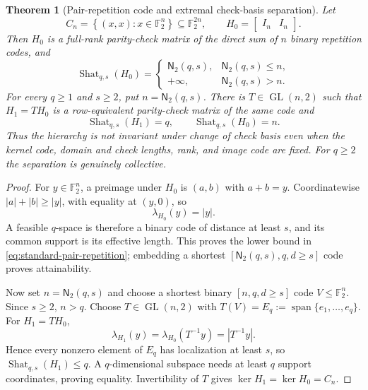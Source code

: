 \documentclass[11pt,letterpaper]{article}
\theoremstyle{plain}
\newtheorem{theorem}{Theorem}[section]
\theoremstyle{definition}
\newcommand{\F}{\mathbb{F}_2}
\newcommand{\Shat}{\operatorname{Shat}}
\newcommand{\1}{\mathbf{1}}
\newcommand{\abs}[1]{\left|#1\right|}
\newcommand{\set}[1]{\left\{#1\right\}}
\begin{document}
\begin{theorem}[Pair-repetition code and extremal check-basis separation]
\label{thm:check-basis-separation}
Let
\[
 C_n=\set{(x,x):x\in\F^n}\subseteq\F^{2n},
 \qquad H_0=\begin{bmatrix}I_n&I_n\end{bmatrix}.
\]
Then $H_0$ is a full-rank parity-check matrix of the direct sum of $n$
binary repetition codes, and
\begin{equation}\label{eq:standard-pair-repetition}
 \Shat_{q,s}(H_0)=
 \begin{cases}
 \mathsf N_2(q,s),&\mathsf N_2(q,s)\le n,\\
 +\infty,&\mathsf N_2(q,s)>n.
 \end{cases}
\end{equation}
For every $q\ge1$ and $s\ge2$, put $n=\mathsf N_2(q,s)$.  There is
$T\in\operatorname{GL}(n,2)$ such that $H_1=TH_0$ is a row-equivalent
parity-check matrix of the same code and
\begin{equation}\label{eq:check-basis-gap}
 \Shat_{q,s}(H_1)=q,
 \qquad \Shat_{q,s}(H_0)=n.
\end{equation}
Thus the hierarchy is not invariant under change of check basis even when the
kernel code, domain and check lengths, rank, and image code are fixed.  For
$q\ge2$ the separation is genuinely collective.
\end{theorem}

\begin{proof}
For $y\in\F^n$, a preimage under $H_0$ is $(a,b)$ with $a+b=y$.
Coordinatewise $\abs a+\abs b\ge\abs y$, with equality at $(y,0)$, so
\begin{equation}\label{eq:H0-lambda}
 \lambda_{H_0}(y)=\abs y.
\end{equation}
A feasible $q$-space is therefore a binary code of distance at least $s$, and
its common support is its effective length.  This proves the lower bound in
\eqref{eq:standard-pair-repetition}; embedding a shortest
$[\mathsf N_2(q,s),q,d\ge s]$ code proves attainability.

Now set $n=\mathsf N_2(q,s)$ and choose a shortest binary $[n,q,d\ge s]$
code $V\le\F^n$.  Since $s\ge2$, $n>q$.  Choose
$T\in\operatorname{GL}(n,2)$ with
$T(V)=E_q:=\operatorname{span}\{e_1,\ldots,e_q\}$.  For $H_1=TH_0$,
\[
 \lambda_{H_1}(y)=\lambda_{H_0}(T^{-1}y)=\abs{T^{-1}y}.
\]
Hence every nonzero element of $E_q$ has localization at least $s$, so
$\Shat_{q,s}(H_1)\le q$.  A $q$-dimensional subspace needs at least $q$
support coordinates, proving equality.  Invertibility of $T$ gives
$\ker H_1=\ker H_0=C_n$.
\end{proof}
\end{document}
